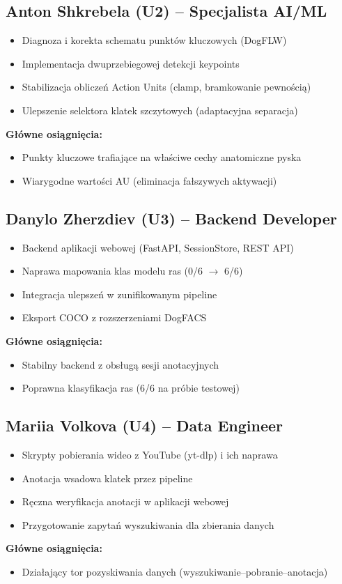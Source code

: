 \documentclass[11pt,a4paper]{article}
\begin{document}
\subsection{Anton Shkrebela (U2) -- Specjalista AI/ML}
\begin{itemize}
  \item Diagnoza i korekta schematu punktów kluczowych (DogFLW)
  \item Implementacja dwuprzebiegowej detekcji keypoints
  \item Stabilizacja obliczeń Action Units (clamp, bramkowanie pewnością)
  \item Ulepszenie selektora klatek szczytowych (adaptacyjna separacja)
\end{itemize}
\textbf{Główne osiągnięcia:}
\begin{itemize}
  \item Punkty kluczowe trafiające na właściwe cechy anatomiczne pyska
  \item Wiarygodne wartości AU (eliminacja fałszywych aktywacji)
\end{itemize}

\subsection{Danylo Zherzdiev (U3) -- Backend Developer}
\begin{itemize}
  \item Backend aplikacji webowej (FastAPI, SessionStore, REST API)
  \item Naprawa mapowania klas modelu ras (0/6 $\rightarrow$ 6/6)
  \item Integracja ulepszeń w zunifikowanym pipeline
  \item Eksport COCO z rozszerzeniami DogFACS
\end{itemize}
\textbf{Główne osiągnięcia:}
\begin{itemize}
  \item Stabilny backend z obsługą sesji anotacyjnych
  \item Poprawna klasyfikacja ras (6/6 na próbie testowej)
\end{itemize}

\subsection{Mariia Volkova (U4) -- Data Engineer}
\begin{itemize}
  \item Skrypty pobierania wideo z YouTube (yt-dlp) i ich naprawa
  \item Anotacja wsadowa klatek przez pipeline
  \item Ręczna weryfikacja anotacji w aplikacji webowej
  \item Przygotowanie zapytań wyszukiwania dla zbierania danych
\end{itemize}
\textbf{Główne osiągnięcia:}
\begin{itemize}
  \item Działający tor pozyskiwania danych (wyszukiwanie--pobranie--anotacja)
\end{itemize}
\end{document}

